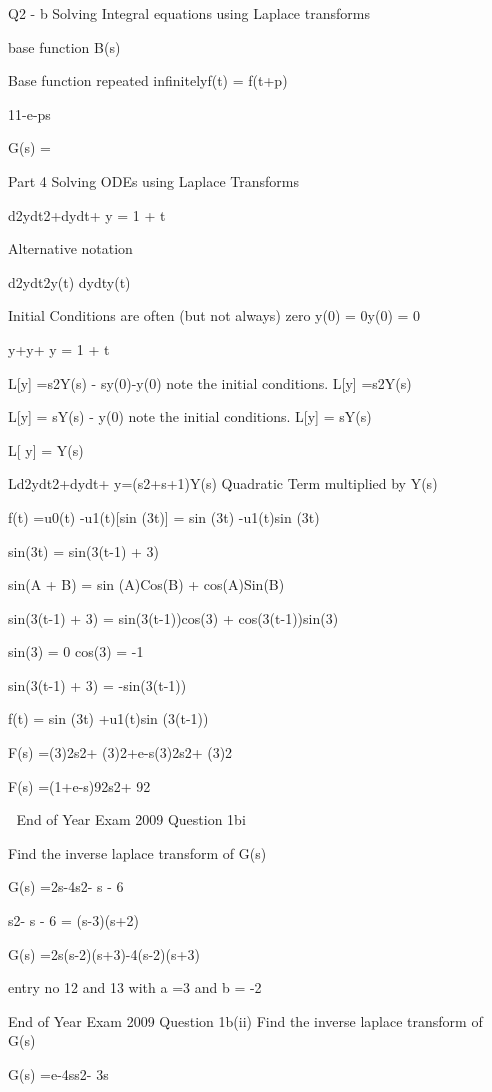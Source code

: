 Q2 - b 
Solving Integral equations using Laplace transforms


base function B(s)

Base function repeated infinitelyf(t) = f(t+p)

11-e-ps

G(s)  = 

 
Part 4 Solving ODEs using Laplace Transforms 
 
d2ydt2+dydt+ y = 1 + t 
 
Alternative notation
 
d2ydt2y(t)				dydty(t)

Initial Conditions are often (but not always) zero	y(0) = 0y(0) = 0
 
 
y+y+ y = 1 + t
 
L[y] =s2Y(s) - sy(0)-y(0)            note the initial conditions. L[y] =s2Y(s)
 
L[y] = sY(s) - y(0)                           note the initial conditions. L[y] = sY(s) 
 
L[ y] = Y(s)
 
Ld2ydt2+dydt+ y=(s2+s+1)Y(s)	Quadratic Term multiplied by Y(s)


 


f(t) =u0(t) -u1(t)[sin (3t)] = sin (3t) -u1(t)sin (3t)

sin(3t) = sin(3(t-1) + 3)

sin(A + B) = sin (A)Cos(B) + cos(A)Sin(B) 

sin(3(t-1) + 3) = sin(3(t-1))cos(3) + cos(3(t-1))sin(3)

sin(3) = 0	           cos(3) = -1

sin(3(t-1) + 3) = -sin(3(t-1))

f(t) = sin (3t) +u1(t)sin (3(t-1))

F(s) =(3)2s2+ (3)2+e-s(3)2s2+ (3)2

F(s) =(1+e-s)92s2+ 92


End of Year Exam  2009 Question 1bi

Find the inverse laplace transform of G(s)

G(s) =2s-4s2- s - 6

s2- s - 6 = (s-3)(s+2)

G(s) =2s(s-2)(s+3)-4(s-2)(s+3)

entry no 12 and 13 with a =3 and b =  -2


End of Year Exam  2009 Question 1b(ii)
Find the inverse laplace transform of G(s)

G(s) =e-4ss2- 3s



